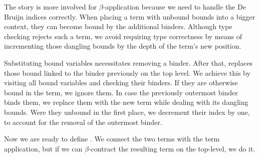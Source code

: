 
The story is more involved for \(\beta\)-application \isa{(\isasymbullet)} because we need to handle the De Bruijn indices correctly.
When placing a term with unbound bounds into a bigger context, they can become bound by the additional binders.
Although type checking rejects such a term, we avoid requiring type correctness by means of incrementing those dangling bounds by the depth of the term's new position.


Substituting bound variables necessitates removing a binder.
After that,  replaces those bound linked to the binder previously on the top level.
We achieve this by visiting all bound variables and checking their binders.
If they are otherwise bound in the term, we ignore them.
In case the previously outermost binder binds them, we replace them with the new term while dealing with its dangling bounds.
Were they unbound in the first place, we decrement their index by one, to account for the removal of the outermost binder.


Now we are ready to define \isa{(\isasymbullet)}.
We connect the two terms with the term application, but if we can \(\beta\)-contract the resulting term on the top-level, we do it.

